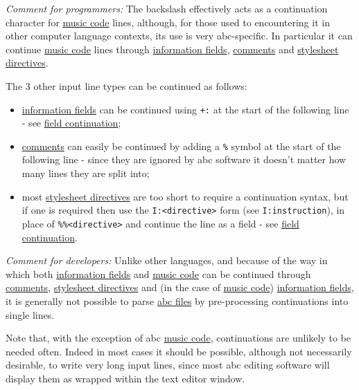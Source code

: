 \emph{Comment for programmers:} The backslash effectively acts as a
continuation character for
\protect\hyperlink{music_code_definition}{music code} lines, although,
for those used to encountering it in other computer language contexts,
its use is very abc-specific. In particular it can continue
\protect\hyperlink{music_code_definition}{music code} lines through
\protect\hyperlink{information_field_definition}{information fields},
\protect\hyperlink{comment_definition}{comments} and
\protect\hyperlink{stylesheet_directive_definition}{stylesheet
directives}.

The 3 other input line types can be continued as follows:

\begin{itemize}
\item
  \protect\hyperlink{information_field_definition}{information fields}
  can be continued using \texttt{+:} at the start of the following line
  - see \protect\hyperlink{field_continuation}{field continuation};
\item
  \protect\hyperlink{comment_definition}{comments} can easily be
  continued by adding a \texttt{\%} symbol at the start of the following
  line - since they are ignored by abc software it doesn't matter how
  many lines they are split into;
\item
  most \protect\hyperlink{stylesheet_directive_definition}{stylesheet
  directives} are too short to require a continuation syntax, but if one
  is required then use the \texttt{I:\textless{}directive\textgreater{}}
  form (see \texttt{I:instruction}), in place of
  \texttt{\%\%\textless{}directive\textgreater{}} and continue the line
  as a field - see \protect\hyperlink{field_continuation}{field
  continuation}.
\end{itemize}

\emph{Comment for developers:} Unlike other languages, and because of
the way in which both
\protect\hyperlink{information_field_definition}{information fields} and
\protect\hyperlink{music_code_definition}{music code} can be continued
through \protect\hyperlink{comment_definition}{comments},
\protect\hyperlink{stylesheet_directive_definition}{stylesheet
directives} and (in the case of
\protect\hyperlink{music_code_definition}{music code})
\protect\hyperlink{information_field_definition}{information fields}, it
is generally not possible to parse
\protect\hyperlink{abc_file_definition}{abc files} by pre-processing
continuations into single lines.

Note that, with the exception of abc
\protect\hyperlink{music_code_definition}{music code}, continuations are
unlikely to be needed often. Indeed in most cases it should be possible,
although not necessarily desirable, to write very long input lines,
since most abc editing software will display them as wrapped within the
text editor window.

